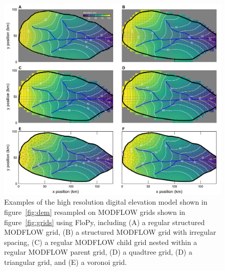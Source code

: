 \documentclass[11pt, oneside]{article}   	%
\begin{document}
\begin{figure}[h]
	\begin{center}
		\includegraphics{figures/grids_geoprocessing.png}
	\end{center}
	\caption{Examples of the high resolution digital elevation model shown in figure~\ref{fig:dem} resampled on MODFLOW grids shown in figure~\ref{fig:grids} using FloPy, including (A) a regular structured MODFLOW grid, (B) a structured MODFLOW grid with irregular spacing, (C) a regular MODFLOW child grid nested within a regular MODFLOW parent grid, (D) a quadtree grid, (D) a triangular grid, and (E) a voronoi grid.}
	\label{fig:geoprocessing}
\end{figure}
\end{document}
